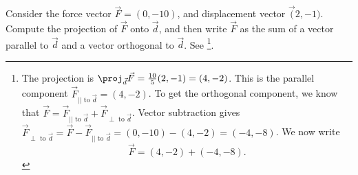 \begin{review*}
 Consider the force vector $\vec F = (0,-10)$, and displacement vector $\vec (2,-1)$.  Compute the projection of $\vec F$ onto $\vec d$, and then write $\vec F$ as the sum of a vector parallel to $\vec d$ and a vector orthogonal to $\vec d$. See \footnote{
The projection is $\proj_{\vec d}\vec F = \frac{10}{5}(2,-1) = (4,-2)$.  This is the parallel component $\vec F_{|| \text{ to }\vec d} =(4,-2)$.  To get the orthogonal component, we know that $\vec F = \vec F_{|| \text{ to }\vec d} + \vec F_{\perp \text{ to }\vec d}$. Vector subtraction gives
$\vec F_{\perp \text{ to }\vec d} = \vec F -\vec F_{|| \text{ to }\vec d} = (0,-10)-(4,-2) = (-4,-8)$.
We now write 
$$\vec F = (4,-2) + (-4,-8).$$
}. 
\end{review*}



